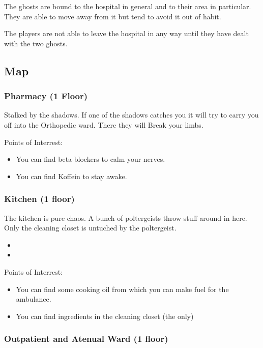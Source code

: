 \documentclass[11pt]{article}
\begin{document}
{The ghosts are bound to the hospital in general and to their area in particular. They are able to move away from it but tend to avoid it out of habit.

The players are not able to leave the hospital in any way until they have dealt with the two ghosts.
\subsection{Map}
\label{sec:orgaab616f}

\subsubsection{Pharmacy (1 Floor)}
\label{sec:org137dc47}

Stalked by the shadows. If one of the shadows catches you it will try to carry you off into the Orthopedic ward. There they will Break your limbs.

Points of Interrest:
\begin{itemize}
\item You can find beta-blockers to calm your nerves.
\item You can find Koffein to stay awake.
\end{itemize}
\subsubsection{Kitchen (1 floor)}
\label{sec:org1c12ffe}

The kitchen is pure chaos. A bunch of poltergeists throw stuff around in here. Only the cleaning closet is untuched by the poltergeist.

\begin{itemize}
\item {}
\item {}
\end{itemize}

Points of Interrest:
\begin{itemize}
\item You can find some cooking oil from which you can make fuel for the ambulance.
\item You can find ingredients in the cleaning closet (the only)
\end{itemize}
\subsubsection{Outpatient and Atenual Ward (1 floor)}
\label{sec:orgddb7055}

}
\end{document}
